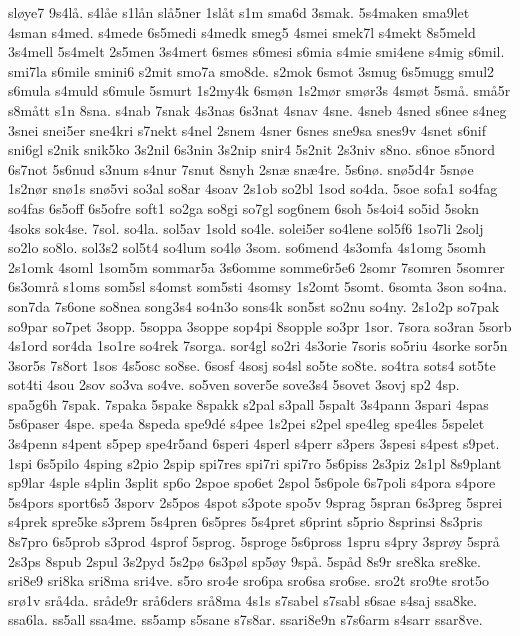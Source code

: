sl^^f8ye7
9s4l^^e5.
s4l^^e5e
s1l^^e5n
sl^^e55ner
1sl^^e5t
s1m
sma6d
3smak.
5s4maken
sma9let
4sman
s4med.
s4mede
6s5medi
s4medk
smeg5
4smei
smek7l
s4mekt
8s5meld
3s4mell
5s4melt
2s5men
3s4mert
6smes
s6mesi
s6mia
s4mie
smi4ene
s4mig
s6mil.
smi7la
s6mile
smini6
s2mit
smo7a
smo8de.
s2mok
6smot
3smug
6s5mugg
smul2
s6mula
s4muld
s6mule
5smurt
1s2my4k
6sm^^f8n
1s2m^^f8r
sm^^f8r3s
4sm^^f8t
5sm^^e5.
sm^^e55r
s8m^^e5tt
s1n
8sna.
s4nab
7snak
4s3nas
6s3nat
4snav
4sne.
4sneb
4sned
s6nee
s4neg
3snei
snei5er
sne4kri
s7nekt
s4nel
2snem
4sner
6snes
sne9sa
snes9v
4snet
s6nif
sni6gl
s2nik
snik5ko
3s2nil
6s3nin
3s2nip
snir4
5s2nit
2s3niv
s8no.
s6noe
s5nord
6s7not
5s6nud
s3num
s4nur
7snut
8snyh
2sn^^e6
sn^^e64re.
5s6n^^f8.
sn^^f85d4r
5sn^^f8e
1s2n^^f8r
sn^^f81s
sn^^f85vi
so3al
so8ar
4soav
2s1ob
so2bl
1sod
so4da.
5soe
sofa1
so4fag
so4fas
6s5off
6s5ofre
soft1
so2ga
so8gi
so7gl
sog6nem
6soh
5s4oi4
so5id
5sokn
4soks
sok4se.
7sol.
so4la.
sol5av
1sold
so4le.
solei5er
so4lene
sol5f6
1so7li
2solj
so2lo
so8lo.
sol3s2
sol5t4
so4lum
so4l^^f8
3som.
so6mend
4s3omfa
4s1omg
5somh
2s1omk
4soml
1som5m
sommar5a
3s6omme
somme6r5e6
2somr
7somren
5somrer
6s3omr^^e5
s1oms
som5sl
s4omst
som5sti
4somsy
1s2omt
5somt.
6somta
3son
so4na.
son7da
7s6one
so8nea
song3s4
so4n3o
sons4k
son5st
so2nu
so4ny.
2s1o2p
so7pak
so9par
so7pet
3sopp.
5soppa
3soppe
sop4pi
8sopple
so3pr
1sor.
7sora
so3ran
5sorb
4s1ord
sor4da
1so1re
so4rek
7sorga.
sor4gl
so2ri
4s3orie
7soris
so5riu
4sorke
sor5n
3sor5s
7s8ort
1sos
4s5osc
so8se.
6sosf
4sosj
so4sl
so5te
so8te.
so4tra
sots4
sot5te
sot4ti
4sou
2sov
so3va
so4ve.
so5ven
sover5e
sove3s4
5sovet
3sovj
sp2
4sp.
spa5g6h
7spak.
7spaka
5spake
8spakk
s2pal
s3pall
5spalt
3s4pann
3spari
4spas
5s6paser
4spe.
spe4a
8speda
spe9d^^e9
s4pee
1s2pei
s2pel
spe4leg
spe4les
5spelet
3s4penn
s4pent
s5pep
spe4r5and
6speri
4sperl
s4perr
s3pers
3spesi
s4pest
s9pet.
1spi
6s5pilo
4sping
s2pio
2spip
spi7res
spi7ri
spi7ro
5s6piss
2s3piz
2s1pl
8s9plant
sp9lar
4sple
s4plin
3split
sp6o
2spoe
spo6et
2spol
5s6pole
6s7poli
s4pora
s4pore
5s4pors
sport6s5
3sporv
2s5pos
4spot
s3pote
spo5v
9sprag
5spran
6s3preg
5sprei
s4prek
spre5ke
s3prem
5s4pren
6s5pres
5s4pret
s6print
s5prio
8sprinsi
8s3pris
8s7pro
6s5prob
s3prod
4sprof
5sprog.
5sproge
5s6pross
1spru
s4pry
3spr^^f8y
5spr^^e5
2s3ps
8spub
2spul
3s2pyd
5s2p^^f8
6s3p^^f8l
sp5^^f8y
9sp^^e5.
5sp^^e5d
8s9r
sre8ka
sre8ke.
sri8e9
sri8ka
sri8ma
sri4ve.
s5ro
sro4e
sro6pa
sro6sa
sro6se.
sro2t
sro9te
srot5o
sr^^f81v
sr^^e54da.
sr^^e5de9r
sr^^e56ders
sr^^e58ma
4s1s
s7sabel
s7sabl
s6sae
s4saj
ssa8ke.
ssa6la.
ss5all
ssa4me.
ss5amp
s5sane
s7s8ar.
ssari8e9n
s7s6arm
s4sarr
ssar8ve.
